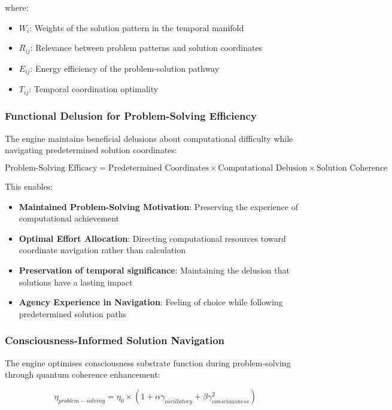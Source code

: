 \documentclass[11pt,a4paper]{article}
\theoremstyle{remark}
\begin{document}
where:
\begin{itemize}
\item $W_i$: Weights of the solution pattern in the temporal manifold
\item $R_{ij}$: Relevance between problem patterns and solution coordinates
\item $E_{ij}$: Energy efficiency of the problem-solution pathway
\item $T_{ij}$: Temporal coordination optimality
\end{itemize}

\subsubsection{Functional Delusion for Problem-Solving Efficiency}

The engine maintains beneficial delusions about computational difficulty while navigating predetermined solution coordinates:

\begin{equation}
\text{Problem-Solving Efficacy} = \text{Predetermined Coordinates} \times \text{Computational Delusion} \times \text{Solution Coherence}
\end{equation}

This enables:
\begin{itemize}
\item \textbf{Maintained Problem-Solving Motivation}: Preserving the experience of computational achievement
\item \textbf{Optimal Effort Allocation}: Directing computational resources toward coordinate navigation rather than calculation
\item \textbf{Preservation of temporal significance}: Maintaining the delusion that solutions have a lasting impact
\item \textbf{Agency Experience in Navigation}: Feeling of choice while following predetermined solution paths
\end{itemize}


\subsubsection{Consciousness-Informed Solution Navigation}

The engine optimises consciousness substrate function during problem-solving through quantum coherence enhancement:

\begin{equation}
\eta_{problem-solving} = \eta_0 \times (1 + \alpha \gamma_{oscillatory} + \beta \gamma_{consciousness}^2)
\end{equation}
\end{document}
